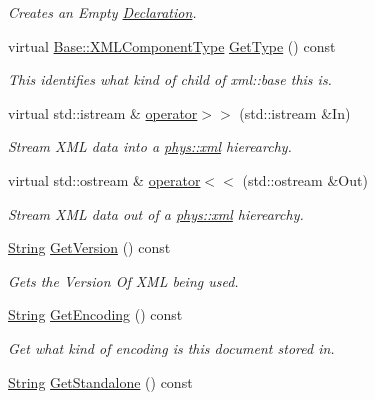 \begin{DoxyCompactItemize}
\begin{DoxyCompactList}\small\item\em Creates an Empty \hyperlink{classphys_1_1xml_1_1Declaration}{Declaration}. \item\end{DoxyCompactList}\item 
virtual \hyperlink{classphys_1_1xml_1_1Base_a62ba0484b5ecb502f9ae9d82d3720320}{Base::XMLComponentType} \hyperlink{classphys_1_1xml_1_1Declaration_a890781a20779f26dabecfa777907b8c3}{GetType} () const 
\begin{DoxyCompactList}\small\item\em This identifies what kind of child of xml::base this is. \item\end{DoxyCompactList}\item 
virtual std::istream \& \hyperlink{classphys_1_1xml_1_1Declaration_a00acf3281c9765d514b1a9afbfd79688}{operator$>$$>$} (std::istream \&In)
\begin{DoxyCompactList}\small\item\em Stream XML data into a \hyperlink{namespacephys_1_1xml}{phys::xml} hierearchy. \item\end{DoxyCompactList}\item 
virtual std::ostream \& \hyperlink{classphys_1_1xml_1_1Declaration_ae57b8d5ac09e41810740cfaf72278fa2}{operator$<$$<$} (std::ostream \&Out)
\begin{DoxyCompactList}\small\item\em Stream XML data out of a \hyperlink{namespacephys_1_1xml}{phys::xml} hierearchy. \item\end{DoxyCompactList}\item 
\hyperlink{namespacephys_aa03900411993de7fbfec4789bc1d392e}{String} \hyperlink{classphys_1_1xml_1_1Declaration_a9a176d4f92d1278f849211911be290ed}{GetVersion} () const 
\begin{DoxyCompactList}\small\item\em Gets the Version Of XML being used. \item\end{DoxyCompactList}\item 
\hyperlink{namespacephys_aa03900411993de7fbfec4789bc1d392e}{String} \hyperlink{classphys_1_1xml_1_1Declaration_aa42a5baf535812505d3940a4a12a9629}{GetEncoding} () const 
\begin{DoxyCompactList}\small\item\em Get what kind of encoding is this document stored in. \item\end{DoxyCompactList}\item 
\hyperlink{namespacephys_aa03900411993de7fbfec4789bc1d392e}{String} \hyperlink{classphys_1_1xml_1_1Declaration_a32f767a5ae92a47b5a49fa59f8ed1a18}{GetStandalone} () const 
\end{DoxyCompactItemize}
